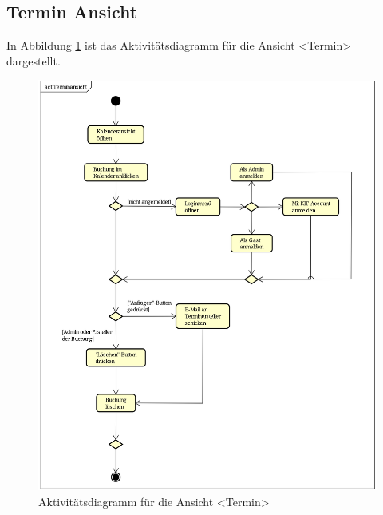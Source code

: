 \subsection{Termin Ansicht}
In Abbildung \ref{fig:activity_diagram_calendar} ist das Aktivitätsdiagramm für die Ansicht <Termin> dargestellt.
\begin{figure}[ht]
    \centering
    \includegraphics[scale=0.25]{figures/activitydiagrams/terminansicht}
    \caption{Aktivitätsdiagramm für die Ansicht <Termin>}
    \label{fig:activity_diagram_calendar}
\end{figure}